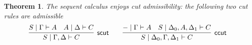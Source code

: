 \documentclass[submission,copyright,creativecommons]{eptcs}
\newtheorem{theorem}{Theorem}[section]
\theoremstyle{definition}
\newcommand{\andlone}{\land \mathsf{L_{1}}}
\newcommand{\andltwo}{\land \mathsf{L_{2}}}
\newcommand{\andr}{\land \mathsf{R}}
\newcommand{\orl}{\lor \mathsf{L}}
\newcommand{\orrone}{\lor \mathsf{R_{1}}}
\newcommand{\orrtwo}{\lor \mathsf{R_{2}}}
\newcommand{\ax}{\mathsf{ax}}
\newcommand{\proofbox}[1]{\begin{tabular}{l} #1 \end{tabular}}
\newcommand\niccolo[1]{\mbox{}
{\marginpar{\color{red}NV}}
{\sf\noindent\color{red}#1}}%
\begin{document}
\begin{theorem}
  The sequent calculus enjoys cut admissibility: the following two cut rules are admissible
    \begin{displaymath}
      \infer[\mathsf{scut}]{S \mid \Gamma , \Delta \vdash C}{
        S \mid \Gamma \vdash A
        &
        A \mid \Delta \vdash C
      }
      \qquad
      \infer[\mathsf{ccut}]{S \mid \Delta_0 , \Gamma , \Delta_1 \vdash C}{
        {-} \mid \Gamma \vdash A
        &
        S \mid \Delta_0 , A , \Delta_1 \vdash C
      }
    \end{displaymath}
\end{theorem}


  
\end{document}
